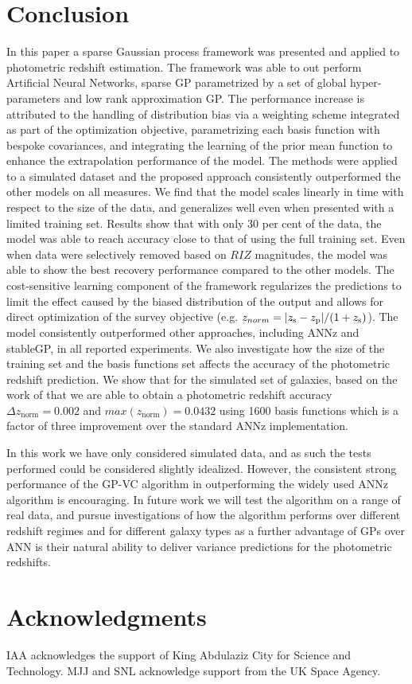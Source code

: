 \documentclass[useAMS,usenatbib,fleqn]{mn2e}
\begin{document}
\section{Conclusion}
\label{sec-conclusion}

In this paper a sparse Gaussian process framework was presented and applied to photometric redshift estimation. The framework was able to out perform Artificial Neural Networks, sparse GP parametrized by a set of global hyper-parameters and low rank approximation GP. The performance increase is attributed to the handling of distribution bias via a weighting scheme integrated as part of the optimization objective, parametrizing each basis function with bespoke covariances, and integrating the learning of the prior mean function to enhance the extrapolation performance of the model. The methods were applied to a simulated dataset and the proposed approach consistently outperformed the other models on all measures. We find that the model scales linearly in time with respect to the size of the data, and generalizes well even when presented with a limited training set. Results show that with only 30 per cent of the data, the model was able to reach accuracy close to that of using the full training set. Even when data were selectively removed based on $RIZ$ magnitudes, the model was able to show the best recovery performance compared to the other models. The cost-sensitive learning component of the framework regularizes the predictions to limit the effect caused by the biased distribution of the output and allows for direct optimization of the survey objective (e.g. $z_{norm} = |z_\textrm{s} - z_\textrm{p}| / (1+z_{\rm s})$). The model consistently outperformed other approaches, including ANNz and stableGP, in all reported experiments. We also investigate how the size of the training set and the basis functions set affects the accuracy of the photometric redshift prediction. We show that for the simulated set of galaxies, based on the work of \cite{jouvel09} that we are able to obtain a photometric redshift accuracy $\Delta z_\textrm{norm}  = 0.002$ and $max\left(z_\textrm{norm}\right)=0.0432$ using 1600 basis functions which is a factor of three improvement over the standard ANNz implementation.

In this work we have only considered simulated data, and as such the tests performed could be considered slightly idealized. However, the consistent strong performance of the GP-VC algorithm in outperforming the widely used ANNz algorithm is encouraging. In future work we will test the algorithm on a range of real data, and pursue investigations of how the algorithm performs over different redshift regimes and for different galaxy types as a further advantage of GPs over ANN is their natural ability to deliver variance predictions for the photometric redshifts.




\section*{Acknowledgments}
IAA acknowledges the support of King Abdulaziz City for Science and Technology.
MJJ and SNL acknowledge support from the UK Space Agency.
\balance
\footnotesize{


}

\label{lastpage}
\end{document}
